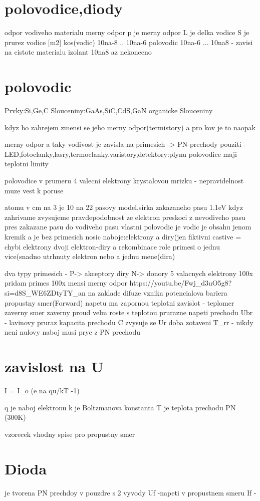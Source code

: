 \documentclass{article}
\begin{document}
\sloppy
\section{polovodice,diody}
odpor vodiveho materialu
merny odpor p je merny odpor
L je delka vodice
S je prurez vodice [m2]
kos(vodic) 10na-8 .. 10na-6
polovodic 10na-6 ... 10na8 - zavisi na cistote materialu
izolant 10na8 az nekonecno
\section{polovodic}
Prvky:Si,Ge,C
Slouceniny:GaAs,SiC,CdS,GaN
organicke Slouceniny

kdyz ho zahrejem zmensi se jeho merny odpor(termistory)
a pro kov je to naopak

merny odpor a taky vodivost je zavisla na primesich -> PN-prechody
pouziti - LED,fotoclanky,lasry,termoclanky,varistory,detektory:plynu
polovodice maji teplotni limity

polovodice v prumeru 4 valecni elektrony
krystalovou mrizku - nepravidelnost muze vest k poruse

atomu v cm na 3 je 10 na 22
pasovy model,sirka zakazaneho pasu 1.1eV
kdyz zahrivame zvysujeme pravdepodobnost ze elektron preskoci z nevodiveho pasu
pres zakazane pasu do vodiveho pasu
vlastni polovodic je vodic je obsahu jenom kremik a je bez primesich
nosic naboje:elektrony a diry(jen fiktivni castive = chybi elektrony
dvoji elektron-diry a rekombinace
role primesi o jednu vice(snadno utrhnuty elektron nebo a jednu mene(dira)

dva typy primesich - P-> akceptory diry
                     N-> donory 5 valacnych elektrony
 100x pridam primes 100x mensi merny odpor
https://youtu.be/Fwj_d3uO5g8?si=d8S_WE6ZDtyTY_an
na zaklade difuze vznika potencialova bariera
    propustny smer(Forward)
        napetu ma zapornou teplotni zavislot - teplomer
    zaverny smer
        zaverny proud velm roste s teplotou
        prurazne napeti prechodu Ubr - lavinovy pruraz
kapacita prechodu C zvysuje se Ur
doba zotaveni T_{rr} - nikdy neni nulovy naboj musi pryc z PN prechodu

\section{zavislost na U}
I = I_o (e na qu/kT -1)

q je naboj elektronu
k je Boltzmanova konstanta
T je teplota prechodu PN (300K)

vzorecek vhodny spise pro propustny smer
\section{Dioda}
je tvorena PN prechdoy v pouzdre s 2 vyvody
Uf -napeti v propustnem smeru
If -
\end{document}
